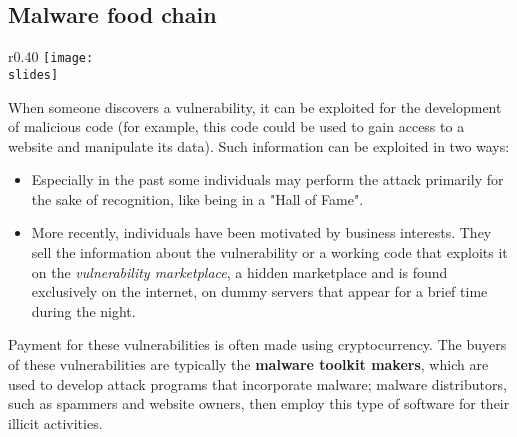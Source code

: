 \subsection{Malware food chain}
\begin{wrapfigure}{r}{0.40\textwidth}
  \centering
  \texttt{[image: \\slides]}
\end{wrapfigure}
When someone discovers a vulnerability, it can be exploited for the development of malicious code (for example, this code could be used to gain access to a website and manipulate its data). Such information can be exploited in two ways:
\begin{itemize}
  \item Especially in the past some individuals may perform the attack primarily for the sake of recognition, like being in a "Hall of Fame".

  \item More recently, individuals have been motivated by business interests. They sell the information about the vulnerability or a working code that exploits it on the \emph{vulnerability marketplace}, a hidden marketplace and is found exclusively on the internet, on dummy servers that appear for a brief time during the night.
\end{itemize}

Payment for these vulnerabilities is often made using cryptocurrency. The buyers of these vulnerabilities are typically the \textbf{malware toolkit makers}, which are used to develop attack programs that incorporate malware; malware distributors, such as spammers and website owners, then employ this type of software for their illicit activities.


